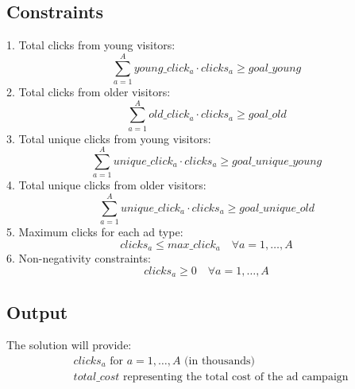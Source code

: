 \documentclass{article}
\begin{document}
\subsection*{Constraints}
1. Total clicks from young visitors:
\[
\sum_{a=1}^{A} young\_click_{a} \cdot clicks_a \geq goal\_young
\]
2. Total clicks from older visitors:
\[
\sum_{a=1}^{A} old\_click_{a} \cdot clicks_a \geq goal\_old
\]
3. Total unique clicks from young visitors:
\[
\sum_{a=1}^{A} unique\_click_{a} \cdot clicks_a \geq goal\_unique\_young
\]
4. Total unique clicks from older visitors:
\[
\sum_{a=1}^{A} unique\_click_{a} \cdot clicks_a \geq goal\_unique\_old
\]
5. Maximum clicks for each ad type:
\[
clicks_a \leq max\_click_a \quad \forall a = 1, \ldots, A
\]
6. Non-negativity constraints:
\[
clicks_a \geq 0 \quad \forall a = 1, \ldots, A
\]

\subsection*{Output}
The solution will provide:
\begin{align*}
& clicks_a \text{ for } a = 1, \ldots, A \text{ (in thousands)} \\
& total\_cost \text{ representing the total cost of the ad campaign}
\end{align*}
\end{document}
